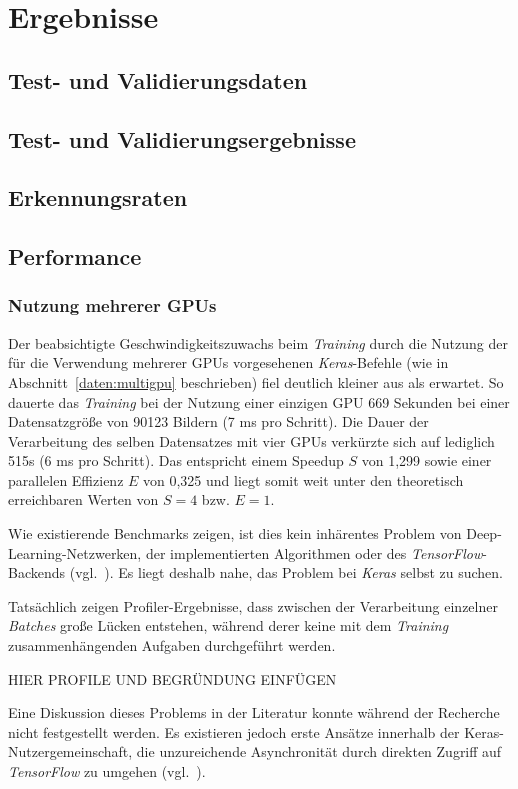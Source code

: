 \section{Ergebnisse}

\subsection{Test- und Validierungsdaten}

\subsection{Test- und Validierungsergebnisse}

\subsection{Erkennungsraten}

\subsection{Performance}

\subsubsection{Nutzung mehrerer GPUs}

Der beabsichtigte Geschwindigkeitszuwachs beim \textit{Training} durch die Nutzung der für die Verwendung mehrerer GPUs
vorgesehenen \textit{Keras}-Befehle (wie in Abschnitt~\ref{daten:multigpu} beschrieben) fiel deutlich kleiner aus als
erwartet. So dauerte das \textit{Training} bei der Nutzung einer einzigen GPU 669 Sekunden bei einer Datensatzgröße
von 90123 Bildern (7 ms pro Schritt). Die Dauer der Verarbeitung des selben Datensatzes mit vier GPUs verkürzte sich auf
lediglich 515s (6 ms pro Schritt). Das entspricht einem Speedup $S$ von 1,299 sowie einer parallelen Effizienz $E$ von
0,325 und liegt somit weit unter den theoretisch erreichbaren Werten von $S = 4$ bzw. $E = 1$.

Wie existierende Benchmarks zeigen, ist dies kein inhärentes Problem von Deep-Learning-Netzwerken, der implementierten
Algorithmen oder des \textit{TensorFlow}-Backends (vgl.~\cite{tensorflowbench}). Es liegt deshalb nahe, das Problem bei
\textit{Keras} selbst zu suchen.

Tatsächlich zeigen Profiler-Ergebnisse, dass zwischen der Verarbeitung einzelner \textit{Batches} große Lücken
entstehen, während derer keine mit dem \textit{Training} zusammenhängenden Aufgaben durchgeführt werden.

HIER PROFILE UND BEGRÜNDUNG EINFÜGEN

Eine Diskussion dieses Problems in der Literatur konnte während der Recherche nicht festgestellt werden. Es existieren
jedoch erste Ansätze innerhalb der Keras-Nutzergemeinschaft, die unzureichende Asynchronität durch direkten Zugriff auf 
\textit{TensorFlow} zu umgehen (vgl.~\cite{zamecnik2017}).
